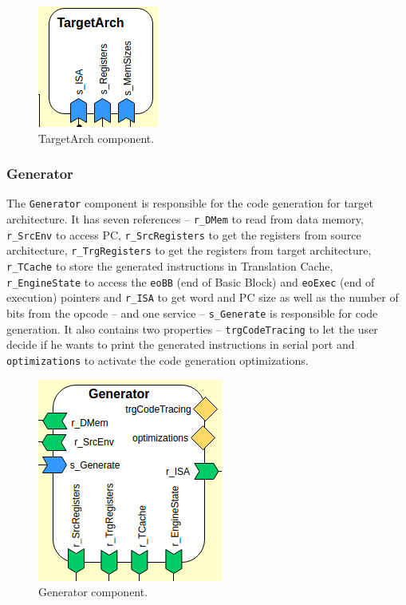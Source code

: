 \documentclass[11pt]{report}
\begin{document}
			\begin{figure} [H]
				\centering
				\includegraphics[width=0.25\linewidth]{Images/arch-ref/TargetArch}
				\caption{TargetArch component.}
				\label{fig:TargetArch}
			\end{figure}
		
			\subsubsection{Generator}
			
			\par The \texttt{Generator} component is responsible for the code generation for target architecture. It has seven references -- \texttt{r\_DMem} to read from data memory, \texttt{r\_SrcEnv} to access PC, \texttt{r\_SrcRegisters} to get the registers from source architecture, \texttt{r\_TrgRegisters} to get the registers from target architecture, \texttt{r\_TCache} to store the generated instructions in Translation Cache, \texttt{r\_EngineState} to access the \texttt{eoBB} (end of Basic Block) and \texttt{eoExec} (end of execution) pointers and \texttt{r\_ISA} to get word and PC size as well as the number of bits from the opcode -- and one service -- \texttt{s\_Generate} is responsible for code generation. It also contains two properties -- \texttt{trgCodeTracing} to let the user decide if he wants to print the generated instructions in serial port and \texttt{optimizations} to activate the code generation optimizations.  
			
			\begin{figure} [H]
				\centering
				\includegraphics[width=0.35\linewidth]{Images/arch-ref/Generator}
				\caption{Generator component.}
				\label{fig:Generator}
			\end{figure}
			
\end{document}
